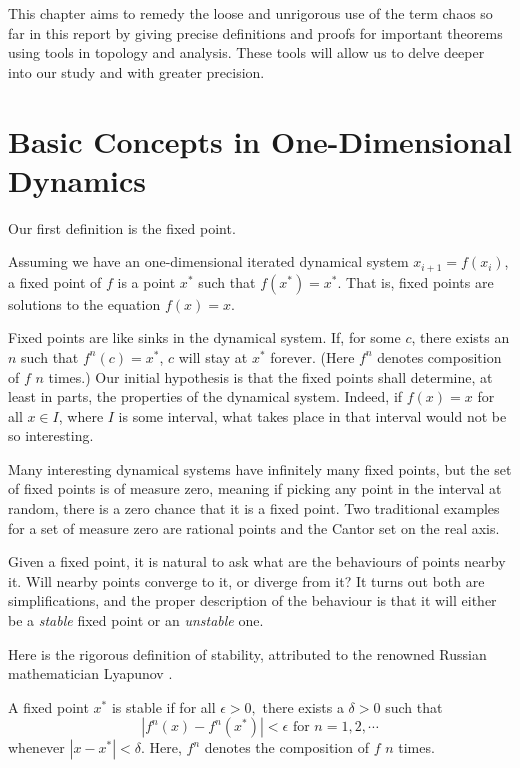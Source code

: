 This chapter aims to remedy the loose and unrigorous use of the term chaos so far in this report by giving precise definitions and proofs for important theorems using tools in topology and analysis. These tools will allow us to delve deeper into our study and with greater precision.

\section{Basic Concepts in One-Dimensional Dynamics}

Our first definition is the fixed point.

\begin{defn}
	Assuming we have an one-dimensional iterated dynamical system $x_{i+1} = f(x_i)$, a fixed point of $f$ is a point $x^*$ such that $f(x^*) = x^*$. 
	That is, fixed points are solutions to the equation $f(x) = x$.
\end{defn}

Fixed points are like sinks in the dynamical system. 
If, for some $c$, there exists an $n$ such that $f^n(c) = x^*$, $c$ will stay at $x^*$ forever. (Here $f^n$ denotes composition of $f$ $n$ times.) 
Our initial hypothesis is that the fixed points shall determine, at least in parts, the properties of the dynamical system.
Indeed, if $f(x) = x$ for all $x \in I$, where $I$ is some interval, what takes place in that interval would not be so interesting.

Many interesting dynamical systems have infinitely many fixed points, but the set of fixed points is of measure zero, meaning if picking any point in the interval at random, there is a zero chance that it is a fixed point.
Two traditional examples for a set of measure zero are rational points and the Cantor set on the real axis. 

Given a fixed point, it is natural to ask what are the behaviours of points nearby it.
Will nearby points converge to it, or diverge from it?
It turns out both are simplifications, and the proper description of the behaviour is that it will either be a \emph{stable} fixed point or an \emph{unstable} one. 

Here is the rigorous definition of stability, attributed to the renowned Russian mathematician Lyapunov \cite{lyapunov}.

\begin{defn}
A fixed point $x^*$ is stable if for all $\epsilon>0,$ there exists a $\delta>0$ such that 
$$
	|f^n(x) - f^n(x^*)| < \epsilon \text{ for } n = 1,2, \cdots 
$$
whenever $|x - x^*| < \delta$.
Here, $f^n$ denotes the composition of $f$ $n$ times.
\end{defn}

